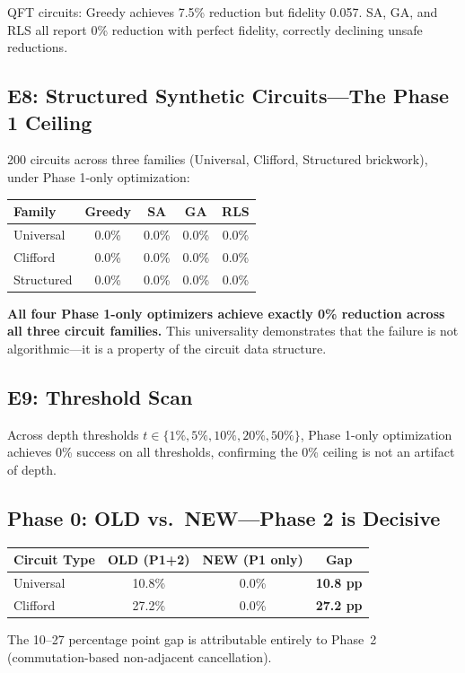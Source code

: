 \documentclass[aps,preprint,secnum,lined]{revtex4-2}
\begin{document}
QFT circuits: Greedy achieves 7.5\% reduction but fidelity 0.057. SA, GA, and RLS all report 0\% reduction with perfect fidelity, correctly declining unsafe reductions.

\subsection{E8: Structured Synthetic Circuits---The Phase 1 Ceiling}
200 circuits across three families (Universal, Clifford, Structured brickwork), under Phase 1-only optimization:

\begin{center}
\begin{tabular}{lcccc}
Family & Greedy & SA & GA & RLS \\ \hline
Universal & 0.0\% & 0.0\% & 0.0\% & 0.0\% \\
Clifford & 0.0\% & 0.0\% & 0.0\% & 0.0\% \\
Structured & 0.0\% & 0.0\% & 0.0\% & 0.0\%
\end{tabular}
\end{center}

\textbf{All four Phase 1-only optimizers achieve exactly 0\% reduction across all three circuit families.} This universality demonstrates that the failure is not algorithmic---it is a property of the circuit data structure.

\subsection{E9: Threshold Scan}
Across depth thresholds $t \in \{1\%, 5\%, 10\%, 20\%, 50\%\}$, Phase 1-only optimization achieves 0\% success on all thresholds, confirming the 0\% ceiling is not an artifact of depth.

\subsection{Phase 0: OLD vs.\ NEW---Phase 2 is Decisive}

\begin{center}
\begin{tabular}{lccc}
Circuit Type & OLD (P1+2) & NEW (P1 only) & Gap \\ \hline
Universal & 10.8\% & 0.0\% & \textbf{10.8 pp} \\
Clifford & 27.2\% & 0.0\% & \textbf{27.2 pp}
\end{tabular}
\end{center}

The 10--27 percentage point gap is attributable entirely to Phase~2 (commutation-based non-adjacent cancellation).
\end{document}
